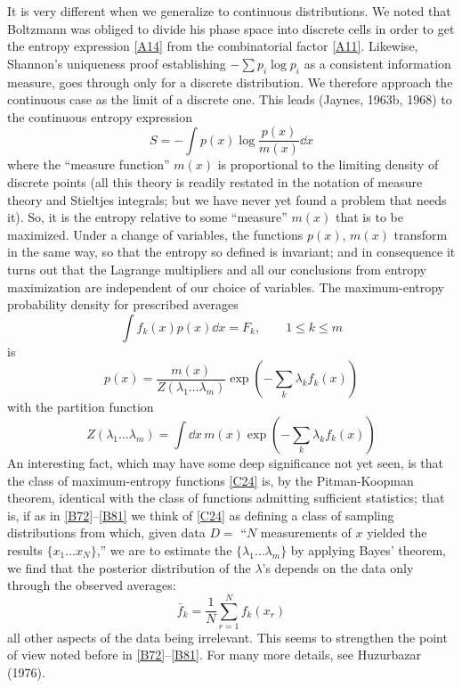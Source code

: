 {It is very different when we generalize to continuous distributions.
We noted that Boltzmann was obliged to divide his phase space into discrete cells in order to get the entropy expression \eqref{A14} from the combinatorial factor \eqref{A11}.
Likewise, Shannon's uniqueness proof establishing $-\sum p_i \log p_i$ as a consistent information measure, goes through only for a discrete distribution.
We therefore approach the continuous case as the limit of a discrete one.
This leads (Jaynes, \cite{jaynes63b}{1963b}, \cite{jaynes68}{1968}) to the continuous entropy expression
\begin{equation}
	\label{C22}
	S = - \int p(x) \log \frac{p(x)}{m(x)} \dd x
\end{equation}
where the ``measure function'' $m(x)$ is proportional to the limiting density of discrete points (all this theory is readily restated in the notation of measure theory and Stieltjes integrals; but we have never yet found a problem that needs it).
So, it is the entropy relative to some ``measure'' $m(x)$ that is to be maximized.
Under a change of variables, the functions $p(x)$, $m(x)$ transform in the same way, so that the entropy so defined is invariant; and in consequence it turns out that the Lagrange multipliers and all our conclusions from entropy maximization are independent of our choice of variables.
The maximum-entropy probability density for prescribed averages
\begin{equation}
	\int f_k(x) p(x) \dd x = F_k, \qquad 1 \leq k \leq m
\end{equation}
is
\begin{equation}
	\label{C24}
	p(x) = \frac{m(x)}{Z(\lambda_1 \ldots \lambda_m)} \exp \left(-\sum_{k} \lambda_k f_k(x)\right)
\end{equation}
with the partition function
\begin{equation}
	Z(\lambda_1 \ldots \lambda_m) = \int\! \dd x\, m(x) \exp \left(-\sum_{k} \lambda_k f_k(x)\right)
\end{equation}
An interesting fact, which may have some deep significance not yet seen, is that the class of maximum-entropy functions \eqref{C24} is, by the Pitman-Koopman theorem, identical with the class of functions admitting sufficient statistics; that is, if as in \eqref{B72}--\eqref{B81} we think of \eqref{C24} as defining a class of sampling distributions from which, given data $D = $ ``$N$ measurements of $x$ yielded the results $\{x_1...x_N\}$,'' we are to estimate the $\{\lambda_1 \ldots \lambda_m\}$ by applying Bayes’ theorem, we find that the posterior distribution of the $\lambda$'s depends on the data only through the observed averages:
\begin{equation}
	\bar{f}_k = \frac{1}{N} \sum_{r=1}^{N} f_k (x_r)
\end{equation}
all other aspects of the data being irrelevant.
This seems to strengthen the point of view noted before in \eqref{B72}--\eqref{B81}.
For many more details, see Huzurbazar (\cite{huzurbazar}{1976}).

}
